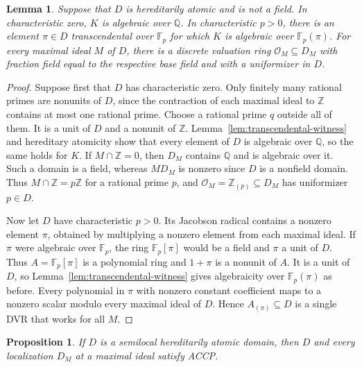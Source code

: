 \documentclass[11pt, letterpaper]{article}
\newtheorem{lemma}[theorem]{Lemma}
\newtheorem{proposition}[theorem]{Proposition}
\theoremstyle{definition}
\theoremstyle{remark}
\begin{document}
\begin{lemma}
    \label{lem:semilocal-base}
    Suppose that $D$ is hereditarily atomic and is not a field.
    In characteristic zero, $K$ is algebraic over $\mathbb{Q}$.
    In characteristic $p > 0$, there is an element $\pi \in D$ transcendental over $\mathbb{F}_{p}$ for which $K$ is algebraic over $\mathbb{F}_{p}(\pi)$.
    For every maximal ideal $M$ of $D$, there is a discrete valuation ring $\mathcal{O}_{M} \subseteq D_{M}$ with fraction field equal to the respective base field and with a uniformizer in $D$.
\end{lemma}

\begin{proof}
    Suppose first that $D$ has characteristic zero.
    Only finitely many rational primes are nonunits of $D$, since the contraction of each maximal ideal to $\mathbb{Z}$ contains at most one rational prime.
    Choose a rational prime $q$ outside all of them.
    It is a unit of $D$ and a nonunit of $\mathbb{Z}$.
    Lemma~\ref{lem:transcendental-witness} and hereditary atomicity show that every element of $D$ is algebraic over $\mathbb{Q}$, so the same holds for $K$.
    If $M \cap \mathbb{Z} = 0$, then $D_{M}$ contains $\mathbb{Q}$ and is algebraic over it.
    Such a domain is a field, whereas $MD_{M}$ is nonzero since $D$ is a nonfield domain.
    Thus $M \cap \mathbb{Z} = p\mathbb{Z}$ for a rational prime $p$, and $\mathcal{O}_{M} = \mathbb{Z}_{(p)} \subseteq D_{M}$ has uniformizer $p \in D$.

    Now let $D$ have characteristic $p > 0$.
    Its Jacobson radical contains a nonzero element $\pi$, obtained by multiplying a nonzero element from each maximal ideal.
    If $\pi$ were algebraic over $\mathbb{F}_{p}$, the ring $\mathbb{F}_{p}[\pi]$ would be a field and $\pi$ a unit of $D$.
    Thus $A = \mathbb{F}_{p}[\pi]$ is a polynomial ring and $1 + \pi$ is a nonunit of $A$.
    It is a unit of $D$, so Lemma~\ref{lem:transcendental-witness} gives algebraicity over $\mathbb{F}_{p}(\pi)$ as before.
    Every polynomial in $\pi$ with nonzero constant coefficient maps to a nonzero scalar modulo every maximal ideal of $D$.
    Hence $A_{(\pi)} \subseteq D$ is a single DVR that works for all $M$.
\end{proof}

\begin{proposition}
    \label{prop:semilocal-accp}
    If $D$ is a semilocal hereditarily atomic domain, then $D$ and every localization $D_{M}$ at a maximal ideal satisfy ACCP.
\end{proposition}
\end{document}
